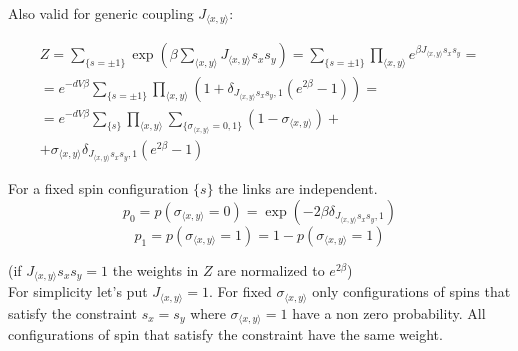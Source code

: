 \documentclass[12pt,handout]{beamer}
\begin{document}
\begin{frame}
\begin{center}

Also valid for generic coupling $J_{\langle x, y \rangle}$:

\begin{gather*}
Z = \sum_{\lbrace s = \pm 1\rbrace} \exp \left( \beta \sum_{\langle x, y \rangle} J_{\langle x, y \rangle} s_x s_y \right) = \sum_{\lbrace s = \pm 1 \rbrace} \prod_{\langle x, y \rangle} e^{ \beta  J_{\langle x, y \rangle} s_x s_y} = \\[20pt]
= e ^{ -d V \beta } \sum_{\lbrace s = \pm 1 \rbrace} \prod_{\langle x, y \rangle} \left( 1 + \delta_{J_{\langle x, y \rangle} s_x s_y, 1} \left( e^{  2 \beta} - 1 \right) \right) = \\[20pt]
= e^{ -d V \beta} \sum_{\lbrace s \rbrace} \prod_{\langle x, y \rangle}   \sum_{\lbrace \sigma_{\langle x, y \rangle} = 0,1 \rbrace}  \left( 1 - \sigma_{\langle x, y \rangle} \right) + \\
+ \sigma_{\langle x, y \rangle} \delta_{J_{\langle x, y \rangle} s_x s_y, 1} \left( e^{ 2 \beta } - 1 \right) 
\end{gather*}

\end{center}
\end{frame}

\begin{frame}
\begin{center}

For a fixed spin configuration $\lbrace s \rbrace$ the links are independent.
\[
p_0 = p \left( \sigma_{\langle x, y \rangle} = 0 \right)  = \exp \left( - 2 \beta \delta_{J_{\langle x, y \rangle} s_x s_y, 1} \right)
\]
\[
p_1 = p \left( \sigma_{\langle x, y \rangle} = 1 \right) = 1 - p \left( \sigma_{\langle x, y \rangle} = 1 \right)
\]

(if $J_{\langle x, y \rangle} s_x s_y = 1$ the weights in $Z$ are normalized to $e^{2 \beta}$)\\
\vspace{30pt}
For simplicity let's put $J_{\langle x, y \rangle} = 1$. For fixed $\sigma_{\langle x, y \rangle}$ only
configurations of spins that satisfy the constraint $s_x = s_y$ where $\sigma_{\langle x, y \rangle} = 1$ have a non zero probability. All configurations of spin that satisfy the constraint have the same weight.

\end{center}
\end{frame}
\end{document}
